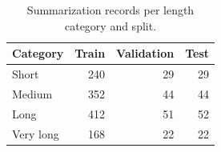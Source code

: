 \begin{table}[t]
\centering
\caption{Summarization records per length category and split.}
\label{tab:t2_summarization_categories}
\begin{tabular}{lrrr}
\toprule
Category & Train & Validation & Test \\
\midrule
Short & 240 & 29 & 29 \\
Medium & 352 & 44 & 44 \\
Long & 412 & 51 & 52 \\
Very long & 168 & 22 & 22 \\
\bottomrule
\end{tabular}
\end{table}
